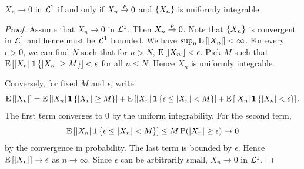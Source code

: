 \begin{lemma}\label{lem:L1_conv_unif_int_conv_prob}
    $X_n\to 0$ in $\L^1$ if and only if $X_n\pto 0$ and $\set{X_n}$ is uniformly 
    integrable. 
\end{lemma}
\begin{proof}
    Assume that $X_n\to 0$ in $\L^1$. Then $X_n\pto 0$. Note that $\set{X_n}$ is 
    convergent in $\L^1$ and hence must be $\L^1$ bounded. We have 
    $\sup_n\E\sbrc{\abs{X_n}}<\infty$. For every $\epsilon>0$, we can find $N$ 
    such that for $n> N$, $\E\sbrc{\abs{X_n}}<\epsilon$. Pick $M$ such that 
    $\E\sbrc{\abs{X_n}\one\set{\abs{X_n}\geq M}}<\epsilon$ for all $n\leq N$. 
    Hence $X_n$ is uniformly integrable. 

    Conversely, for fixed $M$ and $\epsilon$, write 
    \begin{equation*}
        \E\sbrc{\abs{X_n}} = \E\sbrc{\abs{X_n}\one\set{\abs{X_n}\geq M}} 
        + \E\sbrc{\abs{X_n}\one\set{\epsilon\leq\abs{X_n} < M}} 
        + \E\sbrc{\abs{X_n}\one\set{\abs{X_n}<\epsilon}}.  
    \end{equation*}
    The first term converges to $0$ by the uniform integrability. For the 
    second term, 
    \begin{equation*}
        \E\sbrc{\abs{X_n}\one\set{\epsilon\leq\abs{X_n} < M}}\leq M\P(\abs{X_n}\geq \epsilon)\to 0
    \end{equation*}
    by the convergence in probability. The last term is bounded by $\epsilon$. 
    Hence $\E\sbrc{\abs{X_n}}\to \epsilon$ as $n\to\infty$. Since $\epsilon$ 
    can be arbitrarily small, $X_n\to 0$ in $\L^1$. 
\end{proof}

